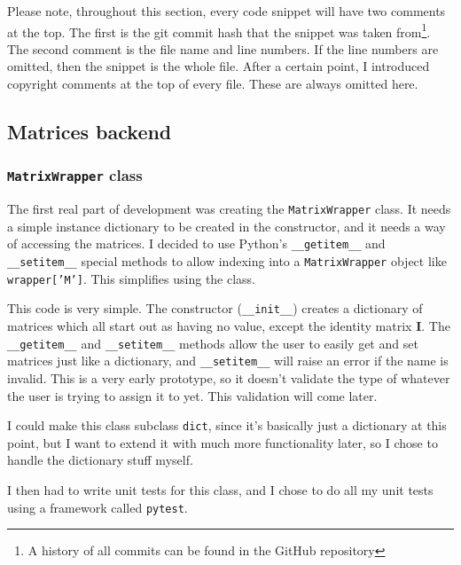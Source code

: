 \documentclass[../main.tex]{subfiles}
\begin{document}
Please note, throughout this section, every code snippet will have two comments at the top. The first is the git commit hash that the snippet was taken from\footnote{A history of all commits can be found in the GitHub repository\cite{lintrans-github}}. The second comment is the file name and line numbers. If the line numbers are omitted, then the snippet is the whole file. After a certain point, I introduced copyright comments at the top of every file. These are always omitted here.

\subsection{Matrices backend\label{development:matrices-backend}}

\subsubsection{\texttt{MatrixWrapper} class\label{development:matrices-backend:MatrixWrapper-class}}

The first real part of development was creating the \texttt{MatrixWrapper} class. It needs a simple instance dictionary to be created in the constructor, and it needs a way of accessing the matrices. I decided to use Python's \texttt{\_\_getitem\_\_} and \texttt{\_\_setitem\_\_} special methods\cite{python-3-special-methods} to allow indexing into a \texttt{MatrixWrapper} object like \texttt{wrapper['M']}. This simplifies using the class.


This code is very simple. The constructor (\texttt{\_\_init\_\_}) creates a dictionary of matrices which all start out as having no value, except the identity matrix \textbf{I}. The \texttt{\_\_getitem\_\_} and \texttt{\_\_setitem\_\_} methods allow the user to easily get and set matrices just like a dictionary, and \texttt{\_\_setitem\_\_} will raise an error if the name is invalid. This is a very early prototype, so it doesn't validate the type of whatever the user is trying to assign it to yet. This validation will come later.

I could make this class subclass \texttt{dict}, since it's basically just a dictionary at this point, but I want to extend it with much more functionality later, so I chose to handle the dictionary stuff myself.

I then had to write unit tests for this class, and I chose to do all my unit tests using a framework called \texttt{pytest}.
\end{document}
